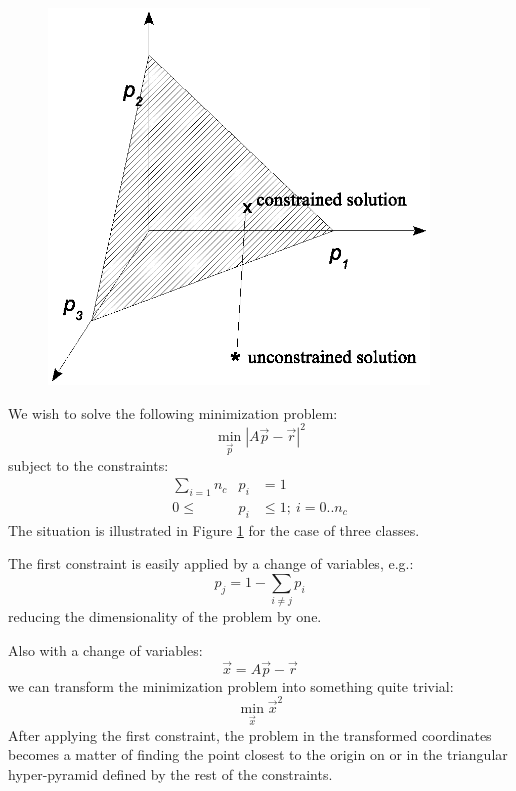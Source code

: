 \documentclass{article}
\begin{document}
\begin{figure}
\includegraphics[width=0.9\textwidth]{config1}
\label{fig1}
\end{figure}

We wish to solve the following minimization problem:
\begin{equation}
\underset{\vec p}{\min} |A \vec p - \vec r|^2
\label{basic_min}
\end{equation}
subject to the constraints:
\begin{eqnarray}
	\sum_{i=1}{n_c} & p_i & = 1 \label{norm_constraint}\\
	0 \le & p_i & \le 1; ~i=0..n_c \label{prob_constraint}
\end{eqnarray}
The situation is illustrated in Figure \ref{fig1} for the case of three classes.

The first constraint is easily applied by a change of variables, e.g.:
\begin{equation}
p_j=1-\sum_{i \ne j} p_i
\end{equation}
reducing the dimensionality of the problem by one. 

Also with a change of variables: 
\begin{equation}
\vec x = A \vec p - \vec r
\end{equation}
we can transform the minimization problem into
something quite trivial:
\begin{equation}
\underset{\vec x}{\min} {\vec x}^2
\label{trivial_min}
\end{equation}
After applying the first constraint, the problem in the transformed coordinates
becomes a matter of finding the point closest to the origin on or in the 
triangular hyper-pyramid defined by the rest of the constraints.
\end{document}
